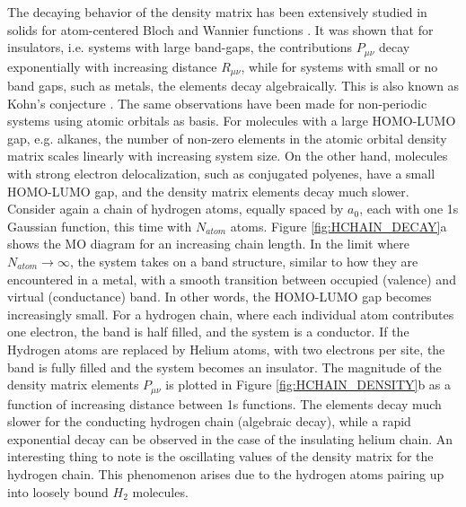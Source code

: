 The decaying behavior of the density matrix has been extensively studied in solids for atom-centered Bloch and Wannier functions \cite{Koh1959,Ism1999,Goe1994,Goe1998,Tar2002}. It was shown that for insulators, i.e. systems with large band-gaps, the contributions $P_{\mu\nu}$ decay exponentially with increasing distance $R_{\mu\nu}$, while for systems with small or no band gaps, such as metals, the elements decay algebraically. This is also known as Kohn's conjecture \cite{Koh1959}.  
The same observations have been made for non-periodic systems using atomic orbitals as basis. For molecules with a large HOMO-LUMO gap, e.g. alkanes, the number of non-zero elements in the atomic orbital density matrix scales linearly with increasing system size. On the other hand, molecules with strong electron delocalization, such as conjugated polyenes, have a small HOMO-LUMO gap, and the density matrix elements decay much slower. 
Consider again a chain of hydrogen atoms, equally spaced by $a_0$, each with one 1s Gaussian function, this time with $N_{atom}$ atoms. Figure \ref{fig:HCHAIN_DECAY}a shows the MO diagram for an increasing chain length. In the limit where $N_{atom} \rightarrow \infty$, the system takes on a band structure, similar to how they are encountered in a metal, with a smooth transition between occupied (valence) and virtual (conductance) band. In other words, the HOMO-LUMO gap becomes increasingly small. For a hydrogen chain, where each individual atom contributes one electron, the band is half filled, and the system is a conductor. If the Hydrogen atoms are replaced by Helium atoms, with two electrons per site, the band is fully filled and the system becomes an insulator.
The magnitude of the density matrix elements $P_{\mu\nu}$ is plotted in Figure \ref{fig:HCHAIN_DENSITY}b as a function of increasing distance between 1s functions. The elements decay much slower for the conducting hydrogen chain (algebraic decay), while a rapid exponential decay can be observed in the case of the insulating helium chain. An interesting thing to note is the oscillating values of the density matrix for the hydrogen chain. This phenomenon arises due to the hydrogen atoms pairing up into loosely bound $H_2$ molecules. 

